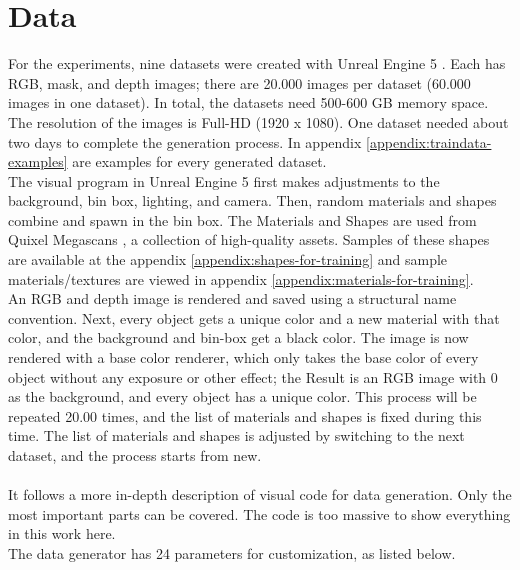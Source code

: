 	\section{Data}
	\label{sec:data}
		For the experiments, nine datasets were created with Unreal Engine 5 \cite{ue5}. Each has RGB, mask, and depth images; there are 20.000 images per dataset (60.000 images in one dataset). In total, the datasets need 500-600 GB memory space. The resolution of the images is Full-HD (1920 x 1080). One dataset needed about two days to complete the generation process. In appendix \ref{appendix:traindata-examples} are examples for every generated dataset.\\
		The visual program in Unreal Engine 5 first makes adjustments to the background, bin box, lighting, and camera. Then, random materials and shapes combine and spawn in the bin box. The Materials and Shapes are used from Quixel Megascans \cite{Quixel}, a collection of high-quality assets. Samples of these shapes are available at the appendix \ref{appendix:shapes-for-training} and sample materials/textures are viewed in appendix \ref{appendix:materials-for-training}.\\
		An RGB and depth image is rendered and saved using a structural name convention. Next, every object gets a unique color and a new material with that color, and the background and bin-box get a black color. The image is now rendered with a base color renderer, which only takes the base color of every object without any exposure or other effect; the Result is an RGB image with 0 as the background, and every object has a unique color. This process will be repeated 20.00 times, and the list of materials and shapes is fixed during this time. The list of materials and shapes is adjusted by switching to the next dataset, and the process starts from new.\\
		\\
		It follows a more in-depth description of visual code for data generation. Only the most important parts can be covered. The code is too massive to show everything in this work here.\\
		The data generator has 24 parameters for customization, as listed below.
